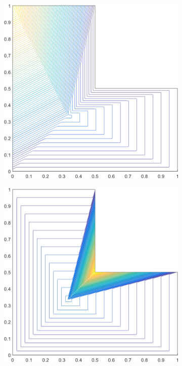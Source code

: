 \begin{figure}
\centering
{
	\begin{subfigure}[b]{0.375\textwidth}
		\centering
		\includegraphics[width=\textwidth]{figures/sec_BF/L-domain_PWLD1_contour_b6.png}
	\end{subfigure}
	\hspace{1.5cm}
	\begin{subfigure}[b]{0.375\textwidth}
		\centering
		\includegraphics[width=\textwidth]{figures/sec_BF/L-domain_PWLD1_contour_b4.png}

\end{subfigure}}
\end{figure}
